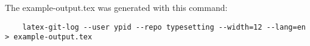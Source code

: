 \documentclass[
  a4paper,
  ngerman,
  landscape,
  DIV=15,
]{scrartcl}
\begin{document}


The example-output.tex was generated with this command:
\begin{verbatim}
	latex-git-log --user ypid --repo typesetting --width=12 --lang=en > example-output.tex
\end{verbatim}
\end{document}
